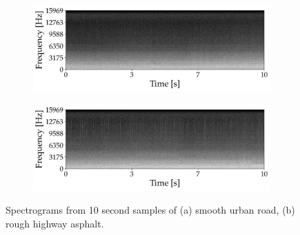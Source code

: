 \begin{figure}[ht]
	\centering
	\begin{subfigure}[b]{0.48\textwidth}
		\includegraphics[width=\textwidth]{img/specgram_REC007}
	\end{subfigure}
	\hfil
	\begin{subfigure}[b]{0.48\textwidth}
		\includegraphics[width=\textwidth]{img/specgram_REC015}
	\end{subfigure}
	\caption[Road noise spectrograms]{Spectrograms from 10 second samples of (a) smooth urban road, (b) rough highway asphalt.}
\label{fig:road_spectrograms}
\end{figure}

